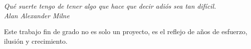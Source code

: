 %
%
%
%
%
%
%
%
%
%
%
%

\ifpdf
\fi

\thispagestyle{empty}
\small

\vfill
\begin{center}
    \emph{Qué suerte tengo de tener algo que hace que decir adiós sea tan difícil.} \\
    \emph{Alan Alexander Milne}
\end{center}
\vfill

\vspace*{\fill}
\begin{center}
    Este trabajo fin de grado no es solo un proyecto, es el reflejo de años de esfuerzo, ilusión y crecimiento.
\end{center}

\newpage
\thispagestyle{empty}\mbox{}

\newpage


